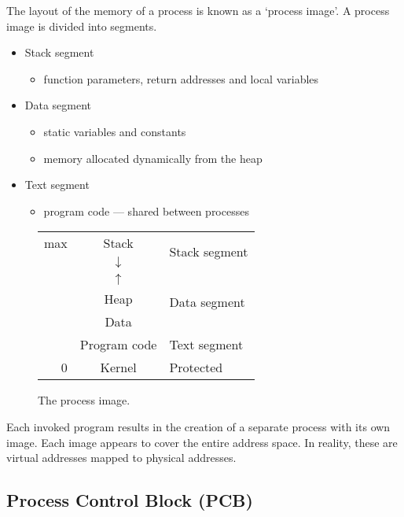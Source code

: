 The layout of the memory of a process is known as a `process image'.
A process image is divided into segments.
\begin{itemize}
  \item Stack segment
  \begin{itemize}
    \item function parameters, return addresses and local variables
  \end{itemize}
  \item Data segment
  \begin{itemize}
    \item static variables and constants
    \item memory allocated dynamically from the heap
  \end{itemize}
  \item Text segment
  \begin{itemize}
    \item program code --- shared between processes
  \end{itemize}
\end{itemize}

\begin{figure}[htp]
  \centering
  \begin{tabular}{r|c|l}
    \hline
    max & Stack          & \multirow{2}{*}{Stack segment} \\
        & \(\downarrow\) &                                \\
    \cline{2-3}
        & \(\uparrow\)   & \multirow{3}{*}{Data segment}  \\
        & Heap           &                                \\
    \cline{2-2}
        & Data           &                                \\
    \cline{2-3}
        & Program code   & Text segment                   \\
    \cline{2-3}
      0 & Kernel         & Protected                      \\
    \hline
  \end{tabular}
  \caption*{The process image.}
\end{figure}

Each invoked program results in the creation of a separate process with its own image.
Each image appears to cover the entire address space.
In reality, these are virtual addresses mapped to physical addresses.

\subsection{Process Control Block (PCB)}

